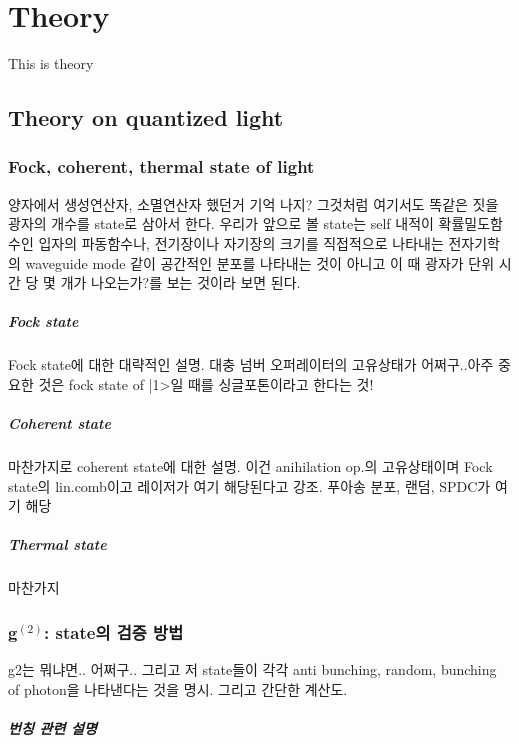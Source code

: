 \chapter{Theory}
\minitocmargin
This is theory

\section{Theory on quantized light}
\subsection{Fock, coherent, thermal state of light}
양자에서 생성연산자, 소멸연산자 했던거 기억 나지? 그것처럼 여기서도 똑같은 짓을 광자의 개수를 state로 삼아서 한다. 우리가 앞으로 볼 state는 self 내적이 확률밀도함수인 입자의 파동함수나, 전기장이나 자기장의 크기를 직접적으로 나타내는 전자기학의 waveguide mode 같이 공간적인 분포를 나타내는 것이 아니고 이 때 광자가 단위 시간 당 몇 개가 나오는가?를 보는 것이라 보면 된다.
\paragraph{Fock state}
Fock state에 대한 대략적인 설명. 대충 넘버 오퍼레이터의 고유상태가 어쩌구..아주 중요한 것은 fock state of |1>일 때를 싱글포톤이라고 한다는 것!
\paragraph{Coherent state}
마찬가지로 coherent state에 대한 설명. 이건 anihilation op.의 고유상태이며 Fock state의 lin.comb이고 레이저가 여기 해당된다고 강조. 푸아송 분포, 랜덤, SPDC가 여기 해당
\paragraph{Thermal state}
마찬가지
\subsection{g$^{(2)}$: state의 검증 방법}
g2는 뭐냐면.. 어쩌구.. 그리고 저 state들이 각각 anti bunching, random, bunching of photon을 나타낸다는 것을 명시. 그리고 간단한 계산도.
\paragraph{번칭 관련 설명}
